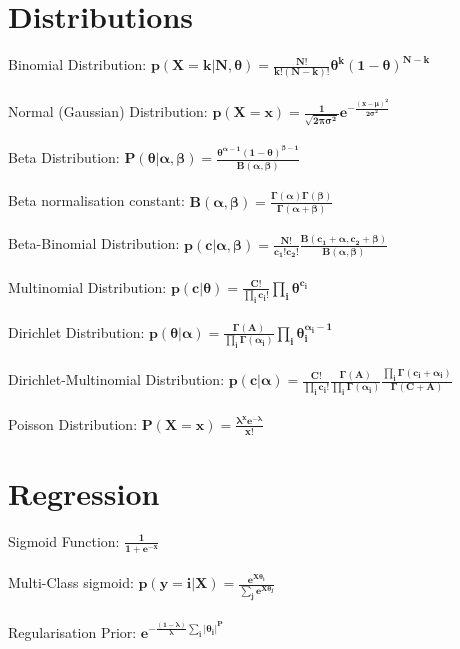 \documentclass{article}
\begin{document}
\section{Distributions}
Binomial Distribution: $\mathbf{p(X = k|N,\theta) = \frac{N!}{k!(N-k)!}\theta^k(1-\theta)^{N-k}}$\\\\
Normal (Gaussian) Distribution: $\mathbf{p(X = x) = \frac{1}{\sqrt{2\pi \sigma ^2}} e^{-\frac{(x-\mu )^2}{2\sigma ^2}}}$\\\\
Beta Distribution: $\mathbf{P(\theta |\alpha ,\beta ) = \frac{\theta^{\alpha - 1}(1-\theta )^{\beta - 1}}{B(\alpha , \beta)}}$\\\\
Beta normalisation constant: $\mathbf{B(\alpha,\beta) = \frac{\Gamma(\alpha)\Gamma(\beta)}{\Gamma(\alpha+\beta)}}$\\\\
Beta-Binomial Distribution: $\mathbf{p(c|\alpha,\beta) = \frac{N!}{c_1!c_2!}\frac{B(c_1 + \alpha, c_2 + \beta)}{B(\alpha,\beta)}}$\\\\
Multinomial Distribution: $\mathbf{p(c|\theta) = \frac{C!}{\prod_{i}^{}c_i!}\prod_{i}^{}\theta^{c_i}}$\\\\
Dirichlet Distribution: $\mathbf{p(\theta|\alpha) = \frac{\Gamma(A)}{\prod_{i}^{}\Gamma(\alpha_i)}\prod_{i}^{}\theta_i^{\alpha_i-1}}$\\\\
Dirichlet-Multinomial Distribution: $\mathbf{p(c|\alpha) = \frac{C!}{\prod_{i}^{}c_i!}\frac{\Gamma(A)}{\prod_{i}^{}\Gamma(\alpha_i)}\frac{\prod_{i}^{}\Gamma(c_i+\alpha_i)}{\Gamma(C+A)}}$\\\\
Poisson Distribution: $\mathbf{P(X=x)=\frac{\lambda^xe^{-\lambda}}{x!}}$
\section{Regression}
Sigmoid Function: $\mathbf{\frac{1}{1+e^{-x}}}$\\\\
Multi-Class sigmoid: $\mathbf{p(y=i|X)=\frac{e^{X\theta_i}}{\sum_{j}^{}e^{X\theta_j}}}$\\\\
Regularisation Prior: $\mathbf{e^{-\frac{(1-\lambda)}{\lambda}\sum_i|\theta_i|^P}}$
\end{document}
